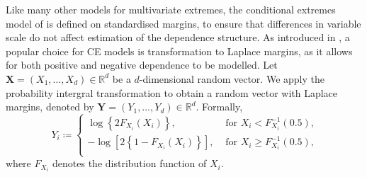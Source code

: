 \documentclass[
  12pt]{article}
\begin{document}
Like many other models for multivariate extremes, the conditional extremes model of \citet{Heffernan2004} is defined on standardised margins, to ensure that differences in variable scale do not affect estimation of the dependence structure.
As introduced in \citet{Keef2013}, a popular choice for CE models is transformation to Laplace margins, as it allows for both positive and negative dependence to be modelled.
Let $\symbf{X} = (X_1, \ldots, X_d) \in \mathbb{R}^d$ be a $d$-dimensional random vector.
We apply the probability intergral transformation to obtain a random vector with Laplace margins, denoted by $\symbf{Y} = (Y_1, \ldots, Y_d) \in \mathbb{R}^d$.
Formally, 
\begin{equation}~\label{eq:laplace}
  Y_i \coloneqq \begin{cases}
    \log\left\{2F_{X_i}(X_i)\right\}, &\text{ for } X_i < F_{X_i}^{-1}(0.5), \\
    -\log\left[2\left\{ 1 - F_{X_i}(X_i)\right\} \right], &\text{ for } X_i \ge F_{X_i}^{-1}(0.5), \\
  \end{cases}
\end{equation}
where $F_{X_i}$ denotes the distribution function of $X_i$. 
\end{document}
